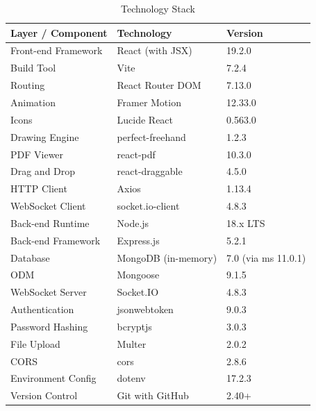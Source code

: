 \documentclass[12pt,a4paper]{report}
\begin{document}
\begin{table}[htbp]
  \caption{Technology Stack}
  \label{tab:4.2}
  \centering
  \begin{tabular}{@{} l l l @{}}
    \toprule
    \textbf{Layer / Component} & \textbf{Technology} & \textbf{Version} \\
    \midrule
    Front-end Framework   & React (with JSX)          & 19.2.0 \\
    Build Tool            & Vite                      & 7.2.4 \\
    Routing               & React Router DOM          & 7.13.0 \\
    Animation             & Framer Motion             & 12.33.0 \\
    Icons                 & Lucide React              & 0.563.0 \\
    Drawing Engine        & perfect-freehand          & 1.2.3 \\
    PDF Viewer            & react-pdf                 & 10.3.0 \\
    Drag and Drop         & react-draggable           & 4.5.0 \\
    HTTP Client           & Axios                     & 1.13.4 \\
    WebSocket Client      & socket.io-client          & 4.8.3 \\
    Back-end Runtime      & Node.js                   & 18.x LTS \\
    Back-end Framework    & Express.js                & 5.2.1 \\
    Database              & MongoDB (in-memory)       & 7.0 (via ms 11.0.1) \\
    ODM                   & Mongoose                  & 9.1.5 \\
    WebSocket Server      & Socket.IO                 & 4.8.3 \\
    Authentication        & jsonwebtoken              & 9.0.3 \\
    Password Hashing      & bcryptjs                  & 3.0.3 \\
    File Upload           & Multer                    & 2.0.2 \\
    CORS                  & cors                      & 2.8.6 \\
    Environment Config    & dotenv                    & 17.2.3 \\
    Version Control       & Git with GitHub           & 2.40+ \\
    \bottomrule
  \end{tabular}
\end{table}
\end{document}
